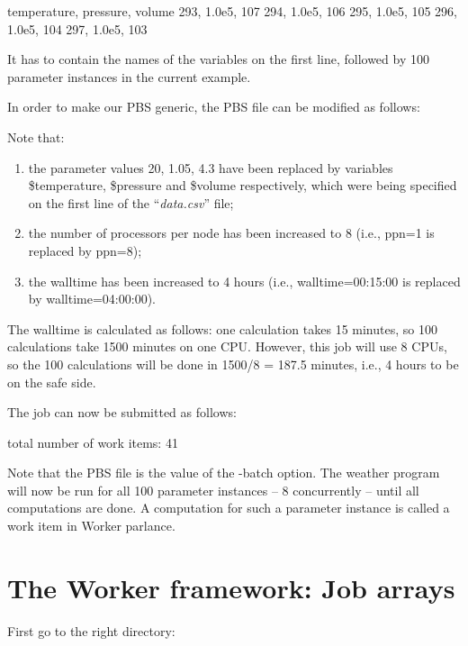 \begin{prompt}
temperature, pressure, volume
293, 1.0e5, 107
294, 1.0e5, 106
295, 1.0e5, 105
296, 1.0e5, 104
297, 1.0e5, 103
\end{prompt}

It has to contain the names of the variables on the first line, followed by 100
parameter instances in the current example.

In order to make our PBS generic, the PBS file can be modified as follows:


Note that:

\begin{enumerate}
  \item  the parameter values 20, 1.05, 4.3 have been replaced by variables
    \$temperature, \$pressure and \$volume respectively, which were being specified
    on the first line of the ``\emph{data.csv}'' file;
  \item  the number of processors per node has been increased to 8 (i.e., ppn=1 is replaced by
    ppn=8);
  \item  the walltime has been increased to 4 hours (i.e.,
    walltime=00:15:00 is replaced by walltime=04:00:00).
\end{enumerate}

The walltime is calculated as follows: one calculation takes 15 minutes, so 100
calculations take 1500 minutes on one CPU. However, this job will use 8 CPUs,
so the 100 calculations will be done in 1500/8 = 187.5 minutes, i.e., 4 hours
to be on the safe side.

The job can now be submitted as follows:
\begin{prompt}
total number of work items: 41
\end{prompt}

Note that the PBS file is the value of the -batch option. The weather program
will now be run for all 100 parameter instances -- 8 concurrently -- until
all computations are done. A computation for such a parameter instance is
called a work item in Worker parlance.

\section{The Worker framework: Job arrays}

First go to the right directory:

